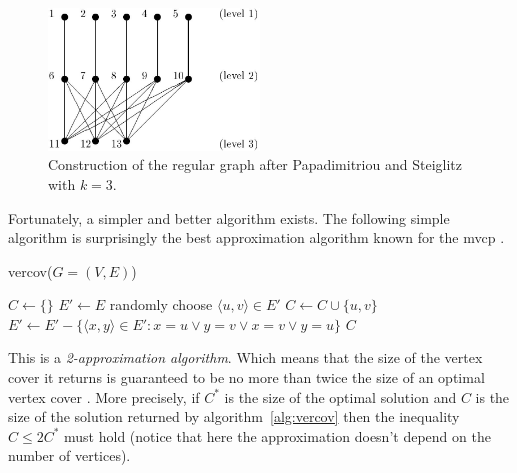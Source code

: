 \documentclass[12pt]{article}
\begin{document}
\begin{figure}[!htbp]
\centering
\includegraphics[width=0.5\textwidth]{ps}
\caption[The regular graph after Papadimitriou
and Steiglitz]{Construction of the regular graph after Papadimitriou
and Steiglitz with $k=3$.}
\label{fig:ps}
\end{figure}

Fortunately, a simpler and better algorithm exists.
The following simple algorithm is surprisingly the
best approximation algorithm known for the mvcp \cite[p.~301]{9:mvcp}.

\begin{algorithm}
\caption{vercov($G = (V, E)$)}
\label{alg:vercov}
\begin{algorithmic}[1]

\State $C \gets \{ \}$
\State $E' \gets E$
\State randomly choose $ \langle u, v \rangle \in E'$
\label{alg:rand}
\State $C \gets C \cup \{u, v\}$
\State $E' \gets E' -
\{ \langle x, y \rangle \in E' : x=u \vee y=v \vee x=v \vee y=u \}$
\State {}
\EndWhile
\State \Return $C$

\end{algorithmic}
\end{algorithm}

This is a \textit{2-approximation algorithm}. Which means that
the size of the vertex cover
it returns is guaranteed to be no more than twice the
size of an optimal vertex cover \cite[p.~968]{cormen}.
More precisely, if $C^*$ is the size of the optimal
solution and $C$ is the size of the solution returned by algorithm~\ref{alg:vercov}
then the inequality $C \leq 2C^*$ must hold (notice that here the approximation
doesn't depend on the number of vertices).
\end{document}
